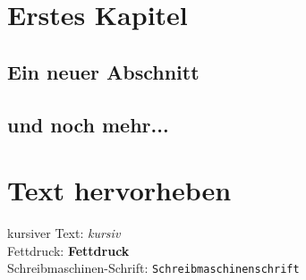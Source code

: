 \documentclass{book}
\begin{document}
\chapter{Erstes Kapitel}
\blindtext
\section{Ein neuer Abschnitt}
\blindtext[5]
\section{und noch mehr...}
\blindtext[2]
\chapter{Text hervorheben}
kursiver Text: \textit{kursiv}\\
Fettdruck: \textbf{Fettdruck}\\
Schreibmaschinen-Schrift: \texttt{Schreibmaschinenschrift}
\end{document}
